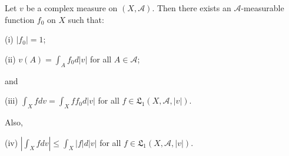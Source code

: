 Let $v$ be a complex measure on $(X, \mathcal{A})$. Then there exists an $\mathcal{A}$-measurable function $f_0$ on $X$ such that:

(i) $|f_0| = 1$;

(ii) $v(A) = \int_A f_0 d|v|$ for all $A \in \mathcal{A}$;

and

(iii) $\int_X f dv = \int_X ff_0 d|v|$ for all $f \in \mathfrak{L}_1(X, \mathcal{A}, |v|)$.

Also,

(iv) $\left| \int_X f dv \right| \leq \int_X |f| d|v|$ for all $f \in \mathfrak{L}_1(X, \mathcal{A}, |v|)$.